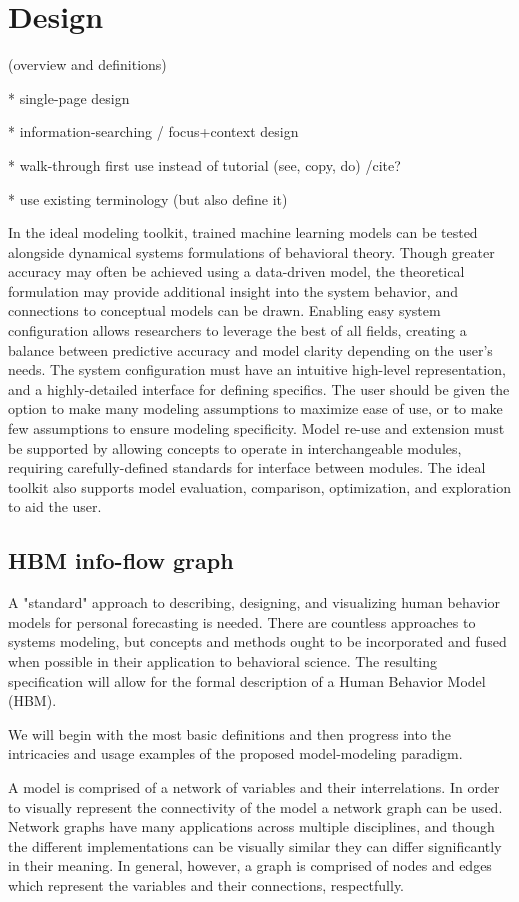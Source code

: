 \section{Design}
(overview and definitions)

* single-page design

* information-searching / focus+context design

* walk-through first use instead of tutorial (see, copy, do) /cite{?}

* use existing terminology (but also define it)

In the ideal modeling toolkit, trained machine learning models can be tested alongside dynamical systems formulations of behavioral theory. 
Though greater accuracy may often be achieved using a data-driven model, the theoretical formulation may provide additional insight into the system behavior, and connections to conceptual models can be drawn. 
Enabling easy system configuration allows researchers to leverage the best of all fields, creating a balance between predictive accuracy and model clarity depending on the user’s needs. 
The system configuration must have an intuitive high-level representation, and a highly-detailed interface for defining specifics. 
The user should be given the option to make many modeling assumptions to maximize ease of use, or to make few assumptions to ensure modeling specificity. 
Model re-use and extension must be supported by allowing concepts to operate in interchangeable modules, requiring carefully-defined standards for interface between modules. 
The ideal toolkit also supports model evaluation, comparison, optimization, and exploration to aid the user.

\subsection{HBM info-flow graph}
A "standard" approach to describing, designing, and visualizing human behavior models for personal forecasting is needed.
There are countless approaches to systems modeling, but concepts and methods ought to be incorporated and fused when possible in their application to behavioral science.
The resulting specification will allow for the formal description of a Human Behavior Model (HBM).

We will begin with the most basic definitions and then progress into the intricacies and usage examples of the proposed model-modeling paradigm.

A model is comprised of a network of variables and their interrelations.
In order to visually represent the connectivity of the model a network graph can be used.
Network graphs have many applications across multiple disciplines, and though the different implementations can be visually similar they can differ significantly in their meaning.
In general, however, a graph is comprised of nodes and edges which represent the variables and their connections, respectfully. 

